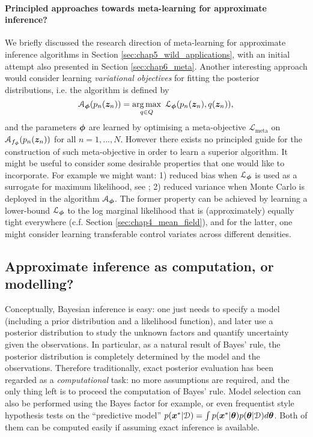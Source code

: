 \paragraph{Principled approaches towards meta-learning for approximate inference?\\}
We briefly discussed the research direction of meta-learning for approximate inference algorithms in Section \ref{sec:chap5_wild_applications}, with an initial attempt also presented in Section \ref{sec:chap6_meta}. Another interesting approach would consider learning \emph{variational objectives} for fitting the posterior distributions, i.e. the algorithm is defined by
\begin{equation}
\mathcal{A}_{\bm{\phi}}(p_n(\bm{z}_n)) = \operatorname*{arg\,max}_{q \in Q} \ \mathcal{L}_{\bm{\phi}}(p_n(\bm{z}_n), q(\bm{z}_n)),
\end{equation}
and the parameters $\bm{\phi}$ are learned by optimising a meta-objective $\mathcal{L}_{\text{meta}}$ on $\mathcal{A}_{f_{\bm{\phi}}}(p_n(\bm{z}_n))$ for all $n = 1, ..., N$. However there exists no principled guide for the construction of such meta-objective in order to learn a superior algorithm. It might be useful to consider some desirable properties that one would like to incorporate. For example we might want: 1) reduced bias when $\mathcal{L}_{\bm{\phi}}$ is used as a surrogate for maximum likelihood, see \citet{turner:two_problems2011}; 2) reduced variance when Monte Carlo is deployed in the algorithm $\mathcal{A}_{\bm{\phi}}$. The former property can be achieved by learning a lower-bound $\mathcal{L}_{\bm{\phi}}$ to the log marginal likelihood that is (approximately) equally tight everywhere (c.f. Section \ref{sec:chap4_mean_field}), and for the latter, one might consider learning transferable control variates across different densities.


\subsection{Approximate inference as computation, or modelling?}

Conceptually, Bayesian inference is easy: one just needs to specify a model (including a prior distribution and a likelihood function), and later use a posterior distribution to study the unknown factors and quantify uncertainty given the observations. In particular, as a natural result of Bayes' rule, the posterior distribution is completely determined by the model and the observations. Therefore traditionally, exact posterior evaluation has been regarded as a \emph{computational} task: no more assumptions are required, and the only thing left is to proceed the computation of Bayes' rule. Model selection can also be performed using the Bayes factor for example, or even frequentist style hypothesis tests on the ``predictive model'' $p(\bm{x}^* | \mathcal{D}) = \int p(\bm{x}^* | \bm{\theta}) p(\bm{\theta} | \mathcal{D}) d \bm{\theta}$. Both of them can be computed easily if assuming exact inference is available.

